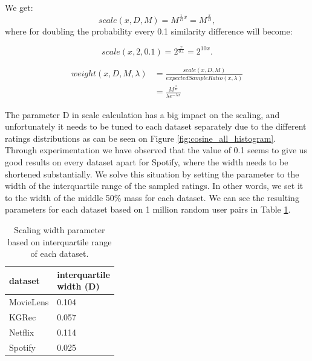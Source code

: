 We get:
\begin{equation}
    scale(x, D, M) = M^{\frac{1}{D}x} = M^{\frac{x}{D}},
\end{equation}
where for doubling the probability every 0.1 similarity difference will become:

\begin{equation}
    scale(x, 2, 0.1) = 2^{\frac{x}{0.1}} = 2^{10x}.
\end{equation}


\begin{equation}\label{eq:weight}
    \begin{aligned}
        weight(x, D, M, \lambda) &= \frac{scale(x, D, M)}{expectedSampleRatio(x, \lambda)} \\
        & = \frac{M^{\frac{x}{D}}}{\lambda e ^{-\lambda x}}
    \end{aligned}
\end{equation}

The parameter D in scale calculation has a big impact on the scaling, and unfortunately it needs to be tuned to each dataset separately due to the different ratings distributions as can be seen on Figure \ref{fig:cosine_all_histogram}. Through experimentation we have observed that the value of 0.1 seems to give us good results on every dataset apart for Spotify, where the width needs to be shortened substantially. We solve this situation by setting the parameter to the width of the interquartile range of the sampled ratings. In other words, we set it to the width of the middle 50\% mass for each dataset. We can see the resulting parameters for each dataset based on 1 million random user pairs in Table \ref{table:5.3_interquartile_width}. 

\begin{table}[!ht]
    \centering
    \begin{tabular}{ l l}
        dataset & \makecell[l]{interquartile \\ width (D)} \\
        \hline
        MovieLens & 0.104 \\
        KGRec & 0.057 \\
        Netflix & 0.114 \\
        Spotify & 0.025
            
    \end{tabular}
    \caption{Scaling width parameter based on interquartile range of each dataset.}
    \label{table:5.3_interquartile_width}
\end{table}



